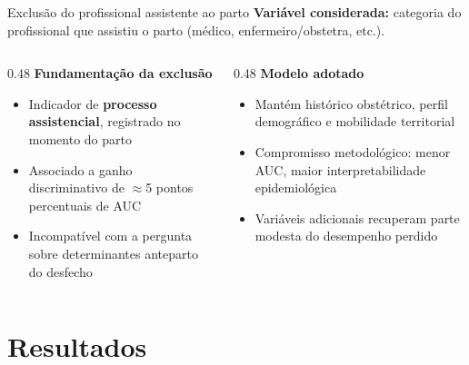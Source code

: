 \documentclass[aspectratio=169,xcolor=table]{beamer}
\begin{document}
\begin{frame}{Exclusão do profissional assistente ao parto}
    \textbf{Variável considerada:} categoria do profissional que assistiu o parto (médico, enfermeiro/obstetra, etc.).

    \vspace{0.4em}
    \begin{columns}[T]
        \begin{column}{0.48\textwidth}
            \textbf{Fundamentação da exclusão}
            \begin{itemize}
                \item Indicador de \textbf{processo assistencial}, registrado no momento do parto
                \item Associado a ganho discriminativo de $\approx$5 pontos percentuais de AUC
                \item Incompatível com a pergunta sobre determinantes anteparto do desfecho
            \end{itemize}
        \end{column}
        \begin{column}{0.48\textwidth}
            \textbf{Modelo adotado}
            \begin{itemize}
                \item Mantém histórico obstétrico, perfil demográfico e mobilidade territorial
                \item Compromisso metodológico: menor AUC, maior interpretabilidade epidemiológica
                \item Variáveis adicionais recuperam parte modesta do desempenho perdido
            \end{itemize}
        \end{column}
    \end{columns}
\end{frame}

\section{Resultados}
\end{document}
